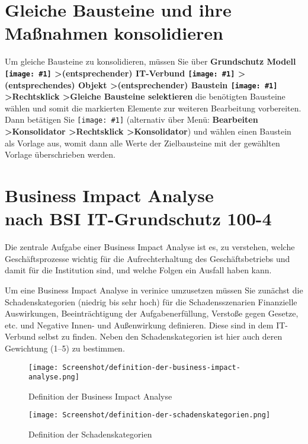 \documentclass[a4paper,10pt]{book}
\newcommand{\icon}[1]{\texttt{[image: \#1]}}
\begin{document}
\section{Gleiche Bausteine und ihre Maßnahmen konsolidieren}
Um gleiche Bausteine zu konsolidieren, müssen Sie über \textbf{Grundschutz Modell \icon{Icon/GS_Modell.png} \textgreater (entsprechender) IT-Verbund \icon{Icon/GS_Modell.png} \textgreater (entsprechendes) Objekt \textgreater (entsprechender) Baustein \icon{Icon/Baustein.png} \textgreater Rechtsklick \textgreater Gleiche Bausteine selektieren} die benötigten Bausteine wählen und somit die markierten Elemente zur weiteren Bearbeitung vorbereiten. Dann betätigen Sie \icon{Icon/Konsolidator.png} (alternativ über Menü: \textbf{Bearbeiten \textgreater Konsolidator \textgreater Rechtsklick \textgreater Konsolidator}) und wählen einen Baustein als Vorlage aus, womit dann alle Werte der Zielbausteine mit der gewählten Vorlage überschrieben werden.


\section{Business Impact Analyse\\ nach BSI IT-Grund\-schutz 100-4}
\label{sec:business-impact-analyse-nach-bsi-it-grundschutz-100-4}

Die zentrale Aufgabe einer Business Impact Analyse ist es, zu verstehen, welche
Geschäftsprozesse wichtig für die Aufrechterhaltung des Geschäftsbetriebs und
damit für die Institution sind, und welche Folgen ein Ausfall haben kann.

Um eine Business Impact Analyse in verinice umzusetzen müssen Sie zunächst die
Schadenskategorien (niedrig bis sehr hoch) für die Schadensszenarien Finanzielle
Auswirkungen, Beeinträchtigung der Aufgabenerfüllung, Verstoße gegen Gesetze,
etc. und Negative Innen- und Außenwirkung definieren. Diese sind in dem
IT-Verbund selbst zu finden. Neben den Schadenskategorien ist hier auch
deren Gewichtung (1--5) zu bestimmen.

\begin{figure}[htb!]
  \centering
  \texttt{[image: Screenshot/definition-der-business-impact-analyse.png]}
  \caption{Definition der Business Impact Analyse}
  \label{fig:definition-der-business-impcat-analyse}
\end{figure}

\begin{figure}[htb!]
  \centering
  \texttt{[image: Screenshot/definition-der-schadenskategorien.png]}
  \caption{Definition der Schadenskategorien}
  \label{fig:definition-der-schadenskategorien}
\end{figure}
\end{document}
